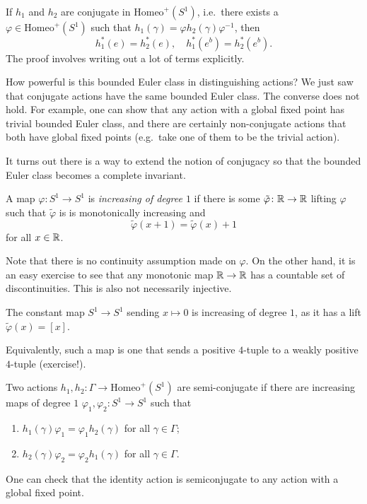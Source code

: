 \documentclass[a4paper]{article}
\newcommand\Homeo{\mathrm{Homeo}}
\begin{document}
\begin{ex}
  If $h_1$ and $h_2$ are conjugate in $\Homeo^+(S^1)$, i.e.\ there exists a $\varphi \in \Homeo^+(S^1)$ such that $h_1(\gamma) = \varphi h_2(\gamma) \varphi^{-1}$, then
  \[
    h_1^*(e) = h_2^*(e),\quad h_1^*(e^b) = h_2^*(e^b).
  \]
  The proof involves writing out a lot of terms explicitly.
\end{ex}

How powerful is this bounded Euler class in distinguishing actions? We just saw that conjugate actions have the same bounded Euler class. The converse does not hold. For example, one can show that any action with a global fixed point has trivial bounded Euler class, and there are certainly non-conjugate actions that both have global fixed points (e.g.\ take one of them to be the trivial action).

It turns out there is a way to extend the notion of conjugacy so that the bounded Euler class becomes a complete invariant.

\begin{defi}
  A map $\varphi\colon S^1 \to S^1$ is \emph{increasing of degree $1$} if there is some $\tilde{\varphi}\colon \mathbb{R} \to \mathbb{R}$ lifting $\varphi$ such that $\tilde{\varphi}$ is is monotonically increasing and
  \[
    \tilde{\varphi}(x + 1) = \tilde{\varphi}(x) + 1
  \]
  for all $x \in \mathbb{R}$.
\end{defi}
Note that there is no continuity assumption made on $\varphi$. On the other hand, it is an easy exercise to see that any monotonic map $\mathbb{R} \to \mathbb{R}$ has a countable set of discontinuities. This is also not necessarily injective.

\begin{eg}
  The constant map $S^1 \to S^1$ sending $x \mapsto 0$ is increasing of degree $1$, as it has a lift $\tilde{\varphi}(x) = [x]$.
\end{eg}

Equivalently, such a map is one that sends a positive $4$-tuple to a weakly positive $4$-tuple (exercise!). %

\begin{defi}
  Two actions $h_1, h_2\colon \Gamma \to \Homeo^+(S^1)$ are semi-conjugate if there are increasing maps of degree $1$ $\varphi_1, \varphi_2\colon S^1 \to S^1$ such that
  \begin{enumerate}
    \item $h_1(\gamma) \varphi_1 = \varphi_1 h_2(\gamma)$ for all $\gamma \in \Gamma$;
    \item $h_2(\gamma) \varphi_2 = \varphi_2 h_1(\gamma)$ for all $\gamma \in \Gamma$.
  \end{enumerate}
\end{defi}
One can check that the identity action is semiconjugate to any action with a global fixed point.
\end{document}
